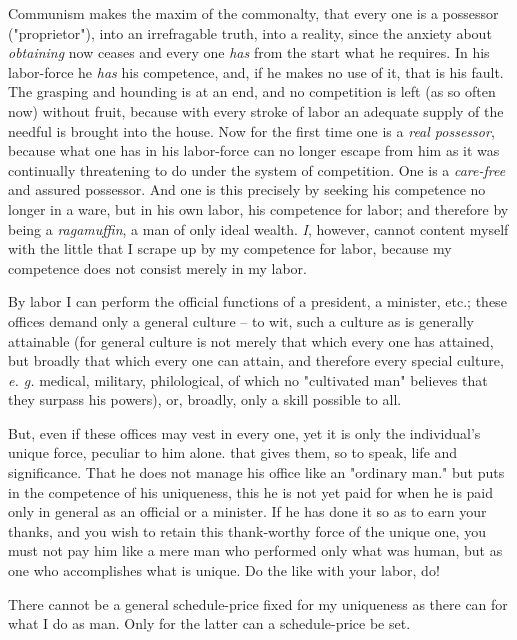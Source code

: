 Communism makes the maxim of the commonalty, that every one is a possessor 
("{}proprietor"{}), into an irrefragable truth, into a reality, since the 
anxiety about \textit{obtaining} now ceases and every one \textit{has} from 
the start what he requires. In his labor-force he \textit{has} his competence, 
and, if he makes no use of it, that is his fault. The grasping and hounding is 
at an end, and no competition is left (as so often now) without fruit, because 
with every stroke of labor an adequate supply of the needful is brought into 
the house. Now for the first time one is a \textit{real possessor}, because 
what one has in his labor-force can no longer escape from him as it was 
continually threatening to do under the system of competition. One is a 
\textit{care-free} and assured possessor. And one is this precisely by seeking 
his competence no longer in a ware, but in his own labor, his competence for 
labor; and therefore by being a \textit{ragamuffin}, a man of only ideal 
wealth. \textit{I}, however, cannot content myself with the little that I 
scrape up by my competence for labor, because my competence does not consist 
merely in my labor.

By labor I can perform the official functions of a president, a minister, 
etc.; these offices demand only a general culture -- to wit, such a culture as 
is generally attainable (for general culture is not merely that which every 
one has attained, but broadly that which every one can attain, and therefore 
every special culture, \textit{e. g.} medical, military, philological, of 
which no "{}cultivated man"{} believes that they surpass his powers), or, 
broadly, only a skill possible to all.

But, even if these offices may vest in every one, yet it is only the 
individual's unique force, peculiar to him alone. that gives them, so to 
speak, life and significance. That he does not manage his office like an 
"{}ordinary man."{} but puts in the competence of his uniqueness, this he is 
not yet paid for when he is paid only in general as an official or a minister. 
If he has done it so as to earn your thanks, and you wish to retain this 
thank-worthy force of the unique one, you must not pay him like a mere man who 
performed only what was human, but as one who accomplishes what is unique. Do 
the like with your labor, do!

There cannot be a general schedule-price fixed for my uniqueness as there can 
for what I do as man. Only for the latter can a schedule-price be set.


